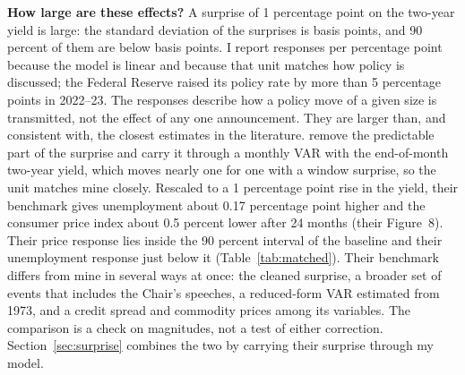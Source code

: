 \documentclass[11pt]{article}
\begin{document}
\textbf{How large are these effects?} A surprise of 1 percentage point on the two-year yield is large: the standard deviation of the surprises is  basis points, and 90 percent of them are below  basis points. I report responses per percentage point because the model is linear and because that unit matches how policy is discussed; the Federal Reserve raised its policy rate by more than 5 percentage points in 2022--23. The responses describe how a policy move of a given size is transmitted, not the effect of any one announcement. They are larger than, and consistent with, the closest estimates in the literature. \citet{bauer2023} remove the predictable part of the surprise and carry it through a monthly VAR with the end-of-month two-year yield, which moves nearly one for one with a window surprise, so the unit matches mine closely. Rescaled to a 1 percentage point rise in the yield, their benchmark gives unemployment about 0.17 percentage point higher and the consumer price index about 0.5 percent lower after 24 months (their Figure~8). Their price response lies inside the 90 percent interval of the baseline and their unemployment response just below it (Table~\ref{tab:matched}). Their benchmark differs from mine in several ways at once: the cleaned surprise, a broader set of events that includes the Chair's speeches, a reduced-form VAR estimated from 1973, and a credit spread and commodity prices among its variables. The comparison is a check on magnitudes, not a test of either correction. Section~\ref{sec:surprise} combines the two by carrying their surprise through my model.
\end{document}
